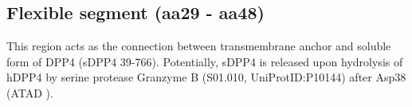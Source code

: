 \subsection{Flexible segment (aa29 - aa48)}

This region acts as the connection between transmembrane anchor and soluble form of DPP4 (sDPP4 39-766). Potentially, sDPP4 is released upon hydrolysis of hDPP4 by serine protease Granzyme B (S01.010, UniProtID:P10144) after Asp38 (ATAD 
\SRKT).~\cite{Song_2018} 
